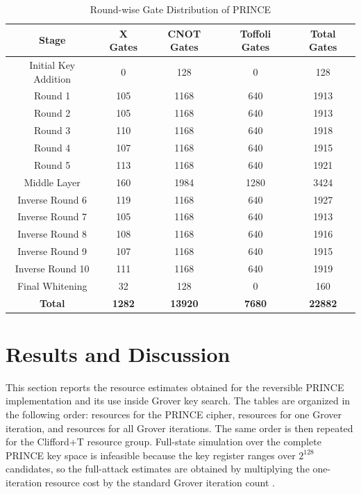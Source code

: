 \documentclass[11pt,a4paper]{article}
\begin{document}
\begin{table}[h]
\centering
\caption{Round-wise Gate Distribution of PRINCE}
\label{tab:round_gate_distribution}
\begin{tabular}{|c|c|c|c|c|}
\hline
\textbf{Stage} & \textbf{X Gates} & \textbf{CNOT Gates} & \textbf{Toffoli Gates} & \textbf{Total Gates} \\
\hline
Initial Key Addition & 0 & 128 & 0 & 128 \\
\hline
Round 1 & 105 & 1168 & 640 & 1913 \\
\hline
Round 2 & 105 & 1168 & 640 & 1913 \\
\hline
Round 3 & 110 & 1168 & 640 & 1918 \\
\hline
Round 4 & 107 & 1168 & 640 & 1915 \\
\hline
Round 5 & 113 & 1168 & 640 & 1921 \\
\hline
Middle Layer & 160 & 1984 & 1280 & 3424 \\
\hline
Inverse Round 6 & 119 & 1168 & 640 & 1927 \\
\hline
Inverse Round 7 & 105 & 1168 & 640 & 1913 \\
\hline
Inverse Round 8 & 108 & 1168 & 640 & 1916 \\
\hline
Inverse Round 9 & 107 & 1168 & 640 & 1915 \\
\hline
Inverse Round 10 & 111 & 1168 & 640 & 1919 \\
\hline
Final Whitening & 32 & 128 & 0 & 160 \\
\hline
\textbf{Total} & \textbf{1282} & \textbf{13920} & \textbf{7680} & \textbf{22882} \\
\hline
\end{tabular}
\end{table}

\section{Results and Discussion}

This section reports the resource estimates obtained for the reversible PRINCE implementation and its use inside Grover key search. The tables are organized in the following order: resources for the PRINCE cipher, resources for one Grover iteration, and resources for all Grover iterations. The same order is then repeated for the Clifford+T resource group. Full-state simulation over the complete PRINCE key space is infeasible because the key register ranges over $2^{128}$ candidates, so the full-attack estimates are obtained by multiplying the one-iteration resource cost by the standard Grover iteration count \cite{grover1996fast,boyer1998tight,grassl2016applying}.
\end{document}
